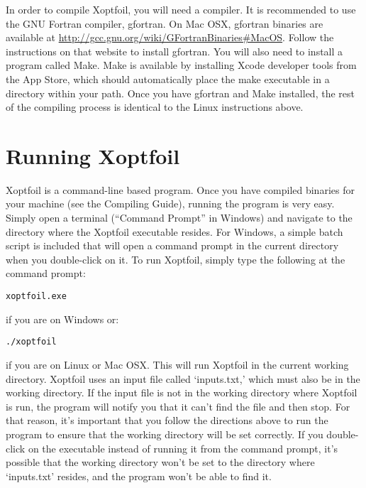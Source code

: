 \documentclass[11pt]{article}
\begin{document}
In order to compile Xoptfoil, you will need a compiler.  It is recommended to use the GNU
Fortran compiler, gfortran.  On Mac OSX, gfortran binaries are available at 
\url{http://gcc.gnu.org/wiki/GFortranBinaries#MacOS}.  Follow the instructions on that
website to install gfortran.  You will also need to install a program called Make.  Make
is available by installing Xcode developer tools from the App Store, which should
automatically place the make executable in a directory within your path. Once you have
gfortran and Make installed, the rest of the compiling process is identical to the Linux
instructions above.

\section{Running Xoptfoil}\label{sec:running}

Xoptfoil is a command-line based program.  Once you have compiled binaries for your
machine (see the Compiling Guide), running the program is very easy.  Simply open a
terminal (``Command Prompt'' in Windows) and navigate to the directory where the Xoptfoil
executable resides.  For Windows, a simple batch script is included that will open a
command prompt in the current directory when you double-click on it.  To run Xoptfoil,
simply type the following at the command prompt:

\begin{verbatim}
xoptfoil.exe
\end{verbatim}

\noindent if you are on Windows or:

\begin{verbatim}
./xoptfoil
\end{verbatim}

\noindent if you are on Linux or Mac OSX.  This will run Xoptfoil in the current working
directory.  Xoptfoil uses an input file called `inputs.txt,' which must also be in the
working directory.  If the input file is not in the working directory where Xoptfoil is
run, the program will notify you that it can't find the file and then stop.  For that
reason, it's important that you follow the directions above to run the program to ensure
that the working directory will be set correctly.  If you double-click on the executable
instead of running it from the command prompt, it's possible that the working directory
won't be set to the directory where `inputs.txt' resides, and the program won't be able to
find it.
\end{document}
